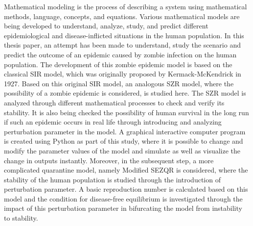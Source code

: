 Mathematical modeling is the process of describing a system using mathematical methods, language, concepts, and equations. Various mathematical models are being developed to understand, analyze, study, and predict different epidemiological and disease-inflicted situations in the human population. In this thesis paper, an attempt has been made to understand, study the scenario and predict the outcome of an epidemic caused by zombie infection on the human population. The development of this zombie epidemic model is based on the classical SIR model, which was originally proposed by Kermack-McKendrick in 1927. Based on this original SIR model, an analogous  SZR model, where the possibility of a zombie epidemic is considered, is studied here. The SZR model is analyzed through different mathematical processes to check and verify its stability. It is also being checked the possibility of human survival in the long run if such an epidemic occurs in real life through introducing and analyzing perturbation parameter in the model. A graphical interactive computer program is created using Python as part of this study, where it is possible to change and modify the parameter values of the model and simulate as well as visualize the change in outputs instantly. Moreover, in the subsequent step, a more complicated quarantine model, namely Modified SEZQR is considered, where the stability of the human population is studied through the introduction of perturbation parameter. A basic reproduction number is calculated based on this model and the condition for disease-free equilibrium is investigated through the impact of this perturbation parameter in bifurcating the model from instability to stability.